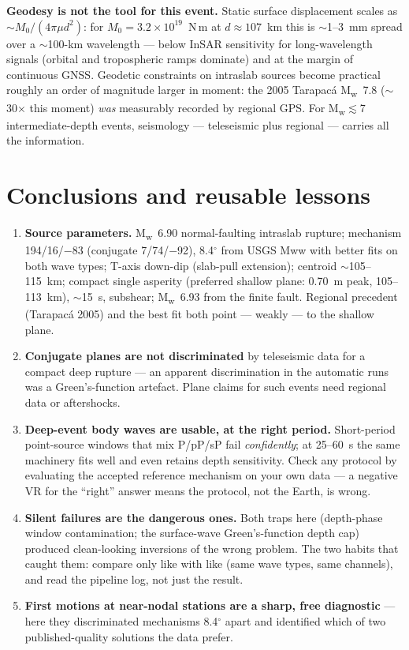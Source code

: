 \documentclass[11pt]{article}
\newcommand{\Mw}{M\textsubscript{w}}
\begin{document}
\textbf{Geodesy is not the tool for this event.} Static surface displacement scales as
$\sim M_0/(4\pi\mu d^2)$: for $M_0=3.2\times10^{19}$~N\,m at $d\approx107$~km this is
$\sim$1--3~mm spread over a $\sim$100-km wavelength --- below InSAR sensitivity for
long-wavelength signals (orbital and tropospheric ramps dominate) and at the margin of
continuous GNSS. Geodetic constraints on intraslab sources become practical roughly an order
of magnitude larger in moment: the 2005 Tarapac\'a \Mw~7.8 ($\sim$30$\times$ this moment)
\emph{was} measurably recorded by regional GPS. For \Mw$\lesssim$7 intermediate-depth
events, seismology --- teleseismic plus regional --- carries all the information.

\section{Conclusions and reusable lessons}
\begin{enumerate}
\item \textbf{Source parameters.} \Mw~6.90 normal-faulting intraslab rupture; mechanism
194/16/$-$83 (conjugate 7/74/$-$92), 8.4$^\circ$ from USGS Mww with better fits on both wave
types; T-axis down-dip (slab-pull extension); centroid $\sim$105--115~km; compact single
asperity (preferred shallow plane: 0.70~m peak, 105--113~km), $\sim$15~s, subshear;
\Mw~6.93 from the finite fault. Regional precedent (Tarapac\'a 2005) and the best fit both
point --- weakly --- to the shallow plane.
\item \textbf{Conjugate planes are not discriminated} by teleseismic data for a compact deep
rupture --- an apparent discrimination in the automatic runs was a Green's-function artefact.
Plane claims for such events need regional data or aftershocks.
\item \textbf{Deep-event body waves are usable, at the right period.} Short-period
point-source windows that mix P/pP/sP fail \emph{confidently}; at 25--60~s the same machinery
fits well and even retains depth sensitivity. Check any protocol by evaluating the accepted
reference mechanism on your own data --- a negative VR for the ``right'' answer means the
protocol, not the Earth, is wrong.
\item \textbf{Silent failures are the dangerous ones.} Both traps here (depth-phase window
contamination; the surface-wave Green's-function depth cap) produced clean-looking inversions
of the wrong problem. The two habits that caught them: compare only like with like (same wave
types, same channels), and read the pipeline log, not just the result.
\item \textbf{First motions at near-nodal stations are a sharp, free diagnostic} --- here they
discriminated mechanisms 8.4$^\circ$ apart and identified which of two published-quality
solutions the data prefer.
\end{enumerate}
\end{document}
